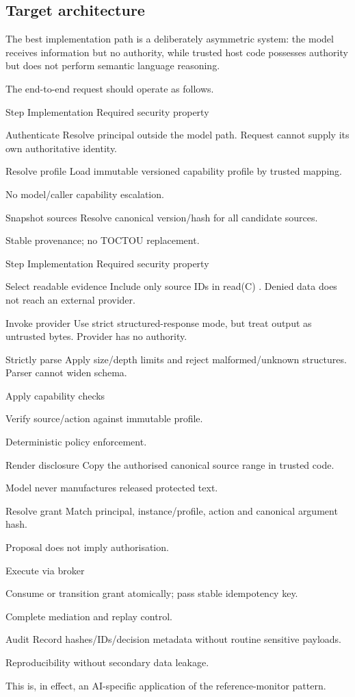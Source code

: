\documentclass[11pt,a4paper]{article}
\begin{document}
\subsection*{Target architecture}
The best implementation path is a deliberately asymmetric system: the model receives information but no authority, while trusted host code possesses authority but does not perform semantic language reasoning.\par
The end-to-end request should operate as follows.\par
Step Implementation Required security property\par
Authenticate Resolve principal outside the model path. Request cannot supply its own authoritative identity.\par
Resolve profile Load immutable versioned capability profile by trusted mapping.\par
No model/caller capability escalation.\par
Snapshot sources Resolve canonical version/hash for all candidate sources.\par
Stable provenance; no TOCTOU replacement.\par
Step Implementation Required security property\par
Select readable evidence Include only source IDs in read(C) . Denied data does not reach an external provider.\par
Invoke provider Use strict structured-response mode, but treat output as untrusted bytes. Provider has no authority.\par
Strictly parse Apply size/depth limits and reject malformed/unknown structures. Parser cannot widen schema.\par
Apply capability checks\par
Verify source/action against immutable profile.\par
Deterministic policy enforcement.\par
Render disclosure Copy the authorised canonical source range in trusted code.\par
Model never manufactures released protected text.\par
Resolve grant Match principal, instance/profile, action and canonical argument hash.\par
Proposal does not imply authorisation.\par
Execute via broker\par
Consume or transition grant atomically; pass stable idempotency key.\par
Complete mediation and replay control.\par
Audit Record hashes/IDs/decision metadata without routine sensitive payloads.\par
Reproducibility without secondary data leakage.\par
This is, in effect, an AI-specific application of the reference-monitor pattern.\par
\end{document}
